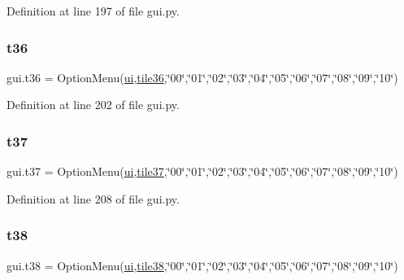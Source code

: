 Definition at line 197 of file gui.\+py.

\mbox{\label{namespacegui_a7195c31f09afde2a7dc7dcacfdf6e2d8}} 
\subsubsection{\texorpdfstring{t36}{t36}}
{\footnotesize\ttfamily gui.\+t36 = Option\+Menu(\mbox{\hyperlink{namespacegui_a40ab7281456eadbea2dc2038f5c24fa1}{ui}},\mbox{\hyperlink{namespacegui_a8bfddabdd4880420216fb021463971bf}{tile36}},\char`\"{}00\char`\"{},\char`\"{}01\char`\"{},\char`\"{}02\char`\"{},\char`\"{}03\char`\"{},\char`\"{}04\char`\"{},\char`\"{}05\char`\"{},\char`\"{}06\char`\"{},\char`\"{}07\char`\"{},\char`\"{}08\char`\"{},\char`\"{}09\char`\"{},\char`\"{}10\char`\"{})}



Definition at line 202 of file gui.\+py.

\mbox{\label{namespacegui_a13cff89f23ee08449bcf8be09c273998}} 
\subsubsection{\texorpdfstring{t37}{t37}}
{\footnotesize\ttfamily gui.\+t37 = Option\+Menu(\mbox{\hyperlink{namespacegui_a40ab7281456eadbea2dc2038f5c24fa1}{ui}},\mbox{\hyperlink{namespacegui_ade77e9bd0a3d48134f03d187fd954e11}{tile37}},\char`\"{}00\char`\"{},\char`\"{}01\char`\"{},\char`\"{}02\char`\"{},\char`\"{}03\char`\"{},\char`\"{}04\char`\"{},\char`\"{}05\char`\"{},\char`\"{}06\char`\"{},\char`\"{}07\char`\"{},\char`\"{}08\char`\"{},\char`\"{}09\char`\"{},\char`\"{}10\char`\"{})}



Definition at line 208 of file gui.\+py.

\mbox{\label{namespacegui_ad82b928eabe782933d61286e8d04f1a1}} 
\subsubsection{\texorpdfstring{t38}{t38}}
{\footnotesize\ttfamily gui.\+t38 = Option\+Menu(\mbox{\hyperlink{namespacegui_a40ab7281456eadbea2dc2038f5c24fa1}{ui}},\mbox{\hyperlink{namespacegui_abdae4a8ae6dac245e5f2874fb10bd3d9}{tile38}},\char`\"{}00\char`\"{},\char`\"{}01\char`\"{},\char`\"{}02\char`\"{},\char`\"{}03\char`\"{},\char`\"{}04\char`\"{},\char`\"{}05\char`\"{},\char`\"{}06\char`\"{},\char`\"{}07\char`\"{},\char`\"{}08\char`\"{},\char`\"{}09\char`\"{},\char`\"{}10\char`\"{})}



